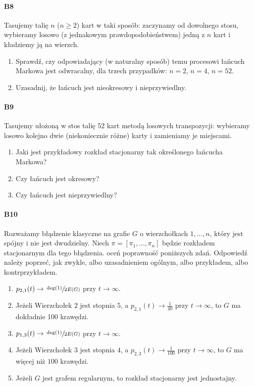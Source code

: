 \paragraph{B8} Tasujemy talię $n$ ($n \geq 2$) kart w taki sposób: zaczynamy od dowolnego stosu, wybieramy losowo (z jednakowym prawdopodobieństwem) jedną
z $n$ kart i kładziemy ją na wierzch.
\begin{enumerate}[label=\alph*)]
\item Sprawdź, czy odpowiadający (w naturalny sposób) temu procesowi łańcuch Markowa jest odwracalny, dla trzech przypadków: $n = 2$, $n = 4$, $n = 52$.
\item Uzasadnij, że łańcuch jest nieokresowy i nieprzywiedlny.
\end{enumerate}

\paragraph{B9} Tasujemy ułożoną w stos talię 52 kart metodą losowych transpozycji: wybieramy losowo kolejno dwie (niekoniecznie różne) karty i zamieniamy je miejscami.
\begin{enumerate}[label=\alph*)]
\item Jaki jest przykładowy rozkład stacjonarny tak określonego łańcucha Markowa?
\item Czy łańcuch jest okresowy?
\item Czy łańcuch jest nieprzywiedlny?
\end{enumerate}

\paragraph{B10} Rozważamy błądzenie klasyczne na grafie $G$ o wierzchołkach $1, . . . , n$, który jest spójny i nie jest dwudzielny. Niech $\pi = [\pi_1, . . . , \pi_n]$ będzie rozkładem stacjonarnym dla tego błądzenia. oceń poprawność poniższych zdań. Odpowiedź należy poprzeć, jak zwykle, albo uzasadnieniem ogólnym, albo przykładem, albo kontrprzykładem.
\begin{enumerate}[label=\alph*)]
\item $p_{2,1}(t) \rightarrow \sfrac{\deg(1)}{2E(G)}$ przy $t\to \infty$.
\item Jeżeli Wierzchołek $2$ jest stopnia $5$, a $p_{2,1}(t) \rightarrow \frac{1}{40}$ przy $t\to \infty$, to $G$ ma dokładnie 100 krawędzi.
\item $p_{1,3}(t) \rightarrow \sfrac{\deg(1)}{2E(G)}$ przy $t\to \infty$.
\item Jeżeli Wierzchołek $3$ jest stopnia $4$, a $p_{2,3}(t) \rightarrow \frac{1}{100}$ przy $t\to \infty$, to $G$ ma więcej niż $100$ krawędzi.
\item Jeżeli $G$ jest grafem regularnym, to rozkład stacjonarny jest jednostajny.
\end{enumerate}

